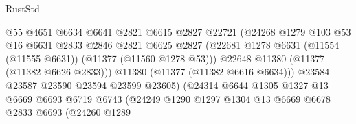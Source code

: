 \begin{lexlean}{RustStd}
\begin{coremodule}
                                        @55
                                        @4651
                                        @6634
                                        @6641
                                        @2821
                                        @6615
                                        @2827
                                        @22721
                                        (@24268
                                          @1279
                                          @103
                                          @53
                                          @16
                                          @6631
                                          @2833
                                          @2846
                                          @2821
                                          @6625
                                          @2827
                                          (@22681
                                            @1278
                                            @6631
                                            (@11554 (@11555 @6631))
                                            (@11377 (@11560 @1278 @53)))
                                          @22648
                                          @11380
                                          (@11377 (@11382 @6626 @2833)))
                                        @11380
                                        (@11377 (@11382 @6616 @6634)))
                                      @23584
                                      @23587
                                      @23590
                                      @23594
                                      @23599
                                      @23605)
                                    (@24314
                                      @6644
                                      @1305
                                      @1327
                                      @13
                                      @6669
                                      @6693
                                      @6719
                                      @6743
                                      (@24249
                                        @1290
                                        @1297
                                        @1304
                                        @13
                                        @6669
                                        @6678
                                        @2833
                                        @6693
                                        (@24260
                                          @1289

\end{coremodule}
\end{lexlean}
